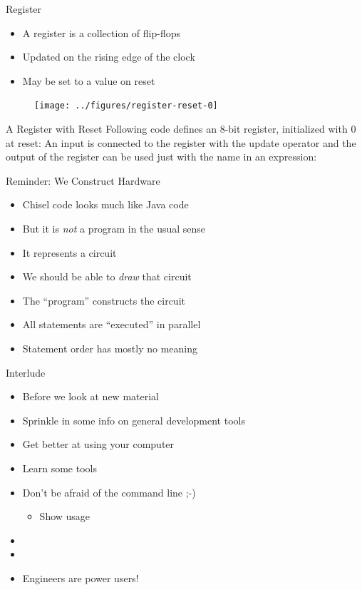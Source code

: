 \begin{frame}[fragile]{Register}
\begin{itemize}
\item A register is a collection of flip-flops
\item Updated on the rising edge of the clock
\item May be set to a value on reset
\end{itemize}
\begin{figure}
  \texttt{[image: ../figures/register-reset-0]}
\end{figure}
\end{frame}

\begin{frame}[fragile]{A Register with Reset}
Following code defines an 8-bit register, initialized with 0 at reset:
\noindent An input is connected to the register with the \code{:=} update operator and
the output of the register can be used just with the name in an expression:
\end{frame}

\begin{frame}[fragile]{Reminder: We Construct Hardware}
\begin{itemize}
\item Chisel code looks much like Java code
\item But it is \emph{not} a program in the usual sense
\item It represents a circuit
\item We should be able to \emph{draw} that circuit
\item The ``program'' constructs the circuit
\item All statements are ``executed'' in parallel
\item Statement order has mostly no meaning
\end{itemize}
\end{frame}

\begin{frame}[fragile]{Interlude}
\begin{itemize}
\item Before we look at new material
\item Sprinkle in some info on general development tools
\item Get better at using your computer
\item Learn some tools
\item Don't be afraid of the command line ;-)
\begin{itemize}
\item Show  usage
\end{itemize}
\item
\item
\item Engineers are power users!
\end{itemize}
\end{frame}

